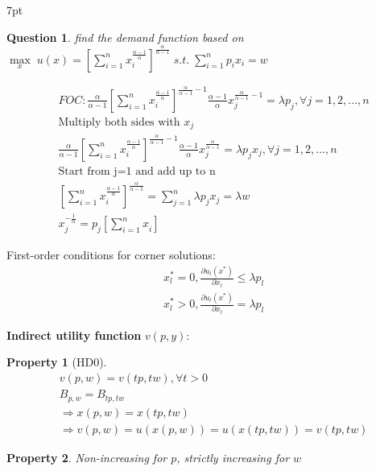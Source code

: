 \documentclass{article}
\newenvironment{redblock}{
\def\FrameCommand{
  \hspace{1pt}
    {\color{LightCoral}
    \vrule width 2pt}
    {\color{redshade}
    \vrule width 4pt}
  \colorbox{redshade}
}
\MakeFramed{
  \advance
  \hsize-
  \width
  \FrameRestore}
\noindent\hspace{-4.55pt}%
\begin{adjustwidth}{}{7pt}
\vspace{2pt}\vspace{2pt}
}
{\vspace{2pt}\end{adjustwidth}\endMakeFramed}
\newtheorem{question}{Question}
\newtheorem{property}{Property}
\begin{document}
\begin{redblock}
\begin{question}
find the demand function based on $\mathop{max}\limits_{x}\;u(x)=[\sum\limits_{i=1}^{n} x_{i}^{\frac{\alpha-1}{\alpha}}]^{\frac{\alpha}{\alpha-1}}\;s.t.\; \sum\limits_{i=1}^{n} p_{i}x_{i}=w$
\end{question}
\begin{align}
&FOC: \frac{\alpha}{\alpha-1}[\sum\limits_{i=1}^{n} x_{i}^{\frac{\alpha-1}{\alpha}}]^{\frac{\alpha}{\alpha-1}-1}\frac{\alpha-1}{\alpha}x_{j}^{\frac{\alpha}{\alpha-1}-1}=\lambda p_{j},\forall j =1,2,...,n
\\&\text{Multiply both sides with }x_{j}
\\&\frac{\alpha}{\alpha-1}[\sum\limits_{i=1}^{n} x_{i}^{\frac{\alpha-1}{\alpha}}]^{\frac{\alpha}{\alpha-1}-1}\frac{\alpha-1}{\alpha}x_{j}^{\frac{\alpha}{\alpha-1}}=\lambda p_{j}x_{j},\forall j =1,2,...,n
\\&\text{Start from j=1 and add up to n}
\\&[\sum\limits_{i=1}^{n}x_{i}^{\frac{\alpha-1}{\alpha}}]^{\frac{\alpha}{\alpha-1}}=\sum\limits_{j=1}^{n}\lambda p_{j}x_{j}=\lambda w
\\&x_{j}^{-\frac{1}{\alpha}}=p_{j}[\sum\limits_{i=1}^{n}x_{i}^{\frac{}{}}]
\end{align}
\end{redblock}


First-order conditions for corner solutions: 
\begin{align}
&x_{l}^{*}=0, \frac{\partial u_{l}(x^{*})}{\partial x_{l}}\le \lambda p_{l}
\\&x_{l}^{*}>0, \frac{\partial u_{l}(x^{*})}{\partial x_{l}}= \lambda p_{l}
\end{align}


\textbf{Indirect utility function} $v(p,y)$:
\begin{property}[HD0]
\begin{align}
&v(p,w)=v(tp,tw),\forall t >0
\\&B_{p,w}=B_{tp,tw}
\\&\Rightarrow x(p,w)=x(tp,tw)
\\&\Rightarrow v(p,w)=u(x(p,w))=u(x(tp,tw))=v(tp,tw)
\end{align}
\end{property}

\begin{property}
Non-increasing for $p$, strictly increasing for $w$
\end{property}
\end{document}
